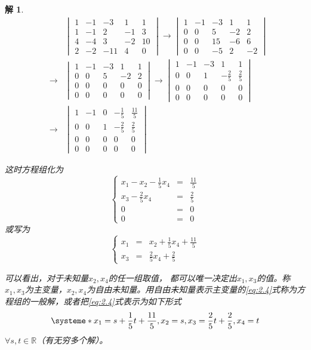 \documentclass[a4paper]{book}
\newtheorem*{solution}{解}
\begin{document}
\begin{solution}
\begin{eqnarray*}
& & \begin{vmatrix} 1 & -1 & -3 & 1 & 1 \\ 1 & -1 & 2 & -1 & 3 \\ 4 & -4 & 3 & -2 & 10 \\ 2 & -2 & -11 & 4 & 0 \end{vmatrix} \longrightarrow \begin{vmatrix} 1 & -1 & -3 & 1 & 1 \\ 0 & 0 & 5 & -2 & 2 \\ 0 & 0 & 15 & -6 & 6 \\ 0 & 0 & -5 & 2 & -2 \end{vmatrix} \\
& \longrightarrow & \begin{vmatrix} 1 & -1 & -3 & 1 & 1 \\ 0 & 0 & 5 & -2 & 2 \\ 0 & 0 & 0 & 0 & 0 \\ 0 & 0 & 0 & 0 & 0 \end{vmatrix}
\longrightarrow \begin{vmatrix} 1 & -1 & -3 & 1 & 1 \\ 0 & 0 & 1 & -\frac25 & \frac25 \\ 0 & 0 & 0 & 0 & 0 \\ 0 & 0 & 0 & 0 & 0 \end{vmatrix} \\
& \longrightarrow & \begin{vmatrix} 1 & -1 & 0 & -\frac15 & \frac{11}{5} \\ 0 & 0 & 1 & -\frac25 & \frac25 \\ 0 & 0 & 0 & 0 & 0 \\ 0 & 0 & 0 & 0 & 0 \end{vmatrix}
\end{eqnarray*}

这时方程组化为
$$\left\{ \begin{array}{rcl} x_1 - x_2 - \frac15 x_4 & = & \frac{11}{5} \\ x_3 - \frac25x_4 & = & \frac25 \\ 0 & = & 0 \\ 0 & = & 0 \end{array}\right.$$
或写为
\begin{equation} \label{eq:2.4}
\left\{ \begin{array}{rcl} x_1 & = & x_2 + \frac15 x_4 + \frac{11}{5} \\ x_3 & = & \frac25x_4 + \frac25 \end{array}\right.
\end{equation}

可以看出，对于未知量$x_2, x_4$的任一组取值， 都可以唯一决定出$x_1, x_3$的值。称$x_1, x_3$为主变量，$x_2, x_4$为自由未知量。用自由未知量表示主变量的\eqref{eq:2.4}式称为方程组的一般解，或者把\eqref{eq:2.4}式表示为如下形式
$$\systeme*{x_1 = s + \frac15 t + \frac{11}{5}, x_2 = s, x_3 = \frac25 t + \frac25, x_4 = t}$$
$\forall s,t \in \mathbb{R}$（有无穷多个解）。
\end{solution}
\end{document}
